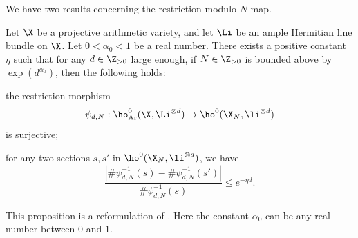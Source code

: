 We have two results concerning the restriction modulo $N$ map.
\begin{prop}\label{modN}
Let $\X$ be a projective arithmetic variety, and let $\Li$ be an ample Hermitian line bundle on $\X$. Let $0<\alpha_0<1$ be a real number. There exists a positive constant $\eta$ such that for any $d\in\Z_{>0}$ large enough, if $N\in \Z_{>0}$ is bounded above by $\exp(d^{\alpha_0})$, then the following holds:
\begin{enumeratei}
\item the restriction morphism
\[
\psi_{d,N}: \ho^0_{\mathrm{Ar}}(\X,\Li^{\otimes d}) \to \ho^0(\X_N,\li^{\otimes d})
\]
is surjective;
\item for any two sections $s,s'$ in $ \ho^0(\X_N,\li^{\otimes d})$, we have
\[
\frac{| \#\psi_{d,N}^{-1}(s)- \#\psi_{d,N}^{-1}(s') |}{\#\psi_{d,N}^{-1}(s)}\leq e^{-\eta d}.
\]
\end{enumeratei}
\end{prop}
This proposition is a reformulation of \cite[Prop.\,2.15]{Ch17}. Here the constant $\alpha_0$ can be any real number between $0$ and $1$.

